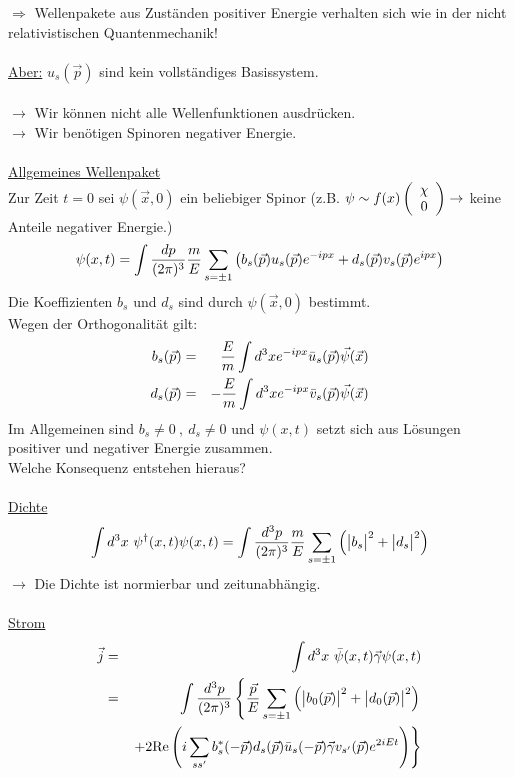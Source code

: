 $\Longrightarrow$ Wellenpakete aus Zuständen positiver Energie verhalten sich wie in der nicht relativistischen Quantenmechanik!\\ \\
\underline{Aber:} $u_s(\vec p)$ sind kein vollständiges Basissystem.\\ \\
$\longrightarrow$ Wir können nicht alle Wellenfunktionen ausdrücken.\\
$\longrightarrow$ Wir benötigen Spinoren negativer Energie.\\ \\ 
\underline{Allgemeines Wellenpaket}\\
Zur Zeit $t=0$ sei $\psi(\vec x,0)$ ein beliebiger Spinor (z.B. $\psi \sim f(x) \left(\begin{array}c \chi\\0\end{array}\ri)\rightarrow$ keine Anteile negativer Energie.)
\begin{eqnarray*}
\psi (x,t) = \int \frac{dp}{(2\pi)^3} \frac m E \sum \limits_{s = \pm 1}\left( b_s(\vec p) u_s(\vec p)e^{-i p x}+ d_s(\vec p)v_s(\vec p)e^{i p x }\right)
\end{eqnarray*}
Die Koeffizienten $b_s$ und $d_s$ sind durch $\psi(\vec x,0)$ bestimmt.\\
Wegen der Orthogonalität gilt:
\begin{eqnarray*}
b_s(\vec p) &=& \frac E m \int d^3 x e^{-i p x}\bar u_s(\vec p)\vec \psi(\vec x)\\
d_s(\vec p) &=& -\frac E m \int d^3 x e^{-i p x}\bar v_s(\vec p)\vec \psi(\vec x)
\end{eqnarray*}
Im Allgemeinen sind $b_s \neq 0\ , \ d _s\neq 0$ und $\psi(x,t)$ setzt sich aus Lösungen positiver und negativer Energie zusammen.\\
Welche Konsequenz entstehen hieraus?\\ \\
\underline{Dichte}
\begin{eqnarray*}
\int d^3 x \ \psi^\dagger (x,t)\psi(x,t) = \int \frac{d^3 p}{(2 \pi)^3} \frac m E \sum \limits_{s = \pm1} \left(\big|b_s\big|^2 + \big|d_s\big|^2\right)
\end{eqnarray*}
$\rightarrow$ Die Dichte ist normierbar und zeitunabhängig.\\
\\
\underline{Strom}
\begin{eqnarray*}
\vec j &=& \int d^3 x \ \bar \psi (x,t)\vec \gamma \psi(x,t)\\
&=& \int \frac{d^3p}{(2\pi)^3} \left \{ \frac{\vec p}E \sum \limits_{s = \pm1}\left(\big|b_0(\vec p)\big|^2 + \big|d_0(\vec p)\big|^2\right)\right. \\&{}&\left.+ 2 \text{Re} \left( i \sum\limits_{ss'} b_s^* (-\vec p)d_s(\vec p) \bar u_s (-\vec p)\vec \gamma v_{s'}(\vec p)e^{2 i Et}\right)\right\}
\end{eqnarray*}
